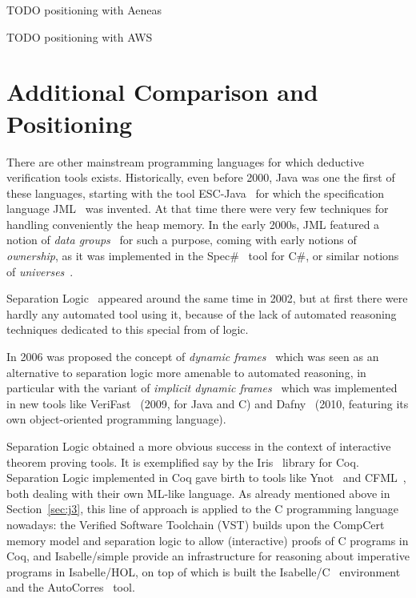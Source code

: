\documentclass[a4paper,11pt]{article}
\begin{document}
TODO positioning with Aeneas~\cite{ho22icfp} 

TODO positioning with AWS 


\section{Additional Comparison and Positioning}
\label{sec:related}


There are other mainstream programming languages for which deductive
verification tools exists. Historically, even before 2000, Java was one the
first of these languages, starting with the tool ESC-Java~\cite{escjava98} for
which the specification language JML~\cite{Burdy04} was invented. At that time
there were very few techniques for handling conveniently the heap memory. In the
early 2000s, JML featured a notion of \emph{data groups}~\cite{breunesse03ftfjp}
for such a purpose, coming with early notions of \emph{ownership}, as it was
implemented in the Spec\#~\cite{BarnettLS04} tool for C\#, or similar notions of
\emph{universes}~\cite{Dietl05jot}.

Separation Logic~\cite{reynolds02lics} appeared around the same time in 2002,
but at first there were hardly any automated tool using it, because of the lack
of automated reasoning techniques dedicated to this special from of logic.

In 2006 was proposed the concept of \emph{dynamic frames}~\cite{kassios2006fm}
which was seen as an alternative to separation logic more amenable to automated
reasoning, in particular with the variant of \emph{implicit dynamic
  frames}~\cite{Smans09} which was implemented in new tools like
VeriFast~\cite{jacobs11nfm} (2009, for Java and C) and
Dafny~\cite{Dafny,leino14fide} (2010, featuring its own object-oriented
programming language).

Separation Logic obtained a more obvious success in the context of interactive
theorem proving tools. It is exemplified say by the Iris~\cite{iris17} library
for Coq. Separation Logic implemented in Coq gave birth to tools like
Ynot~\cite{nanevski08icfp} and CFML~\cite{chargueraud08icfp}, both dealing with
their own ML-like language. As already mentioned above in Section~\ref{sec:j3},
this line of approach is applied to the C programming language nowadays: the
Verified Software Toolchain (VST) builds upon the CompCert memory model and
separation logic to allow (interactive) proofs of C programs in Coq, and
Isabelle/simple provide an infrastructure for reasoning about imperative
programs in Isabelle/HOL, on top of which is built the
Isabelle/C~\cite{tuong19fide} environment and the
AutoCorres~\cite{greenaway14pldi} tool.
\end{document}
